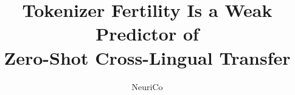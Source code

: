 \documentclass{article}
\title{Tokenizer Fertility Is a Weak Predictor of\\Zero-Shot Cross-Lingual Transfer}
\author{NeuriCo}
\begin{document}
\maketitle

\begin{abstract}

\end{abstract}










\appendix

\end{document}
